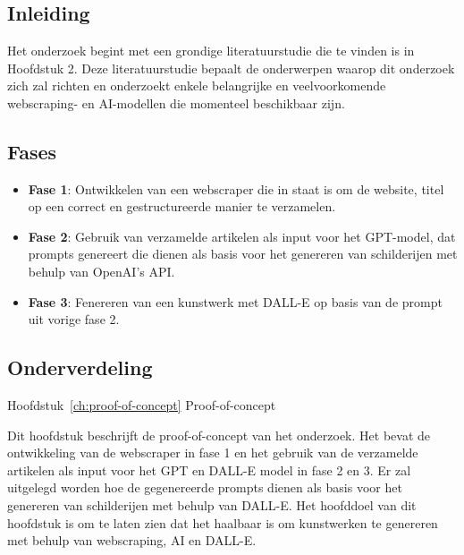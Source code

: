 
\chapter{}%
\label{ch:methodologie}

\section{Inleiding}
Het onderzoek begint met een grondige literatuurstudie die te vinden is in Hoofdstuk 2. Deze literatuurstudie bepaalt de onderwerpen waarop dit onderzoek zich zal richten en onderzoekt enkele belangrijke en veelvoorkomende webscraping- en AI-modellen die momenteel beschikbaar zijn.  \\

\section{Fases}
\begin{itemize}
    \item \textbf{Fase 1}: Ontwikkelen van een webscraper die in staat is om de website, titel op een correct en gestructureerde manier te verzamelen. 
    \item \textbf{Fase 2}: Gebruik van verzamelde artikelen als input voor het GPT-model, dat prompts genereert die dienen als basis voor het genereren van schilderijen met behulp van OpenAI's API.
    \item \textbf{Fase 3}: Fenereren van een kunstwerk met DALL-E op basis van de prompt uit vorige fase 2.
\end{itemize} 

\section{Onderverdeling}

Hoofdstuk~\ref{ch:proof-of-concept} Proof-of-concept

Dit hoofdstuk beschrijft de proof-of-concept van het onderzoek. Het bevat de ontwikkeling van de webscraper in fase 1 en het gebruik van de verzamelde artikelen als input voor het GPT en DALL-E model in fase 2 en 3. Er zal uitgelegd worden hoe de gegenereerde prompts dienen als basis voor het genereren van schilderijen met behulp van DALL-E. Het hoofddoel van dit hoofdstuk is om te laten zien dat het haalbaar is om kunstwerken te genereren met behulp van webscraping, AI en DALL-E. \\

